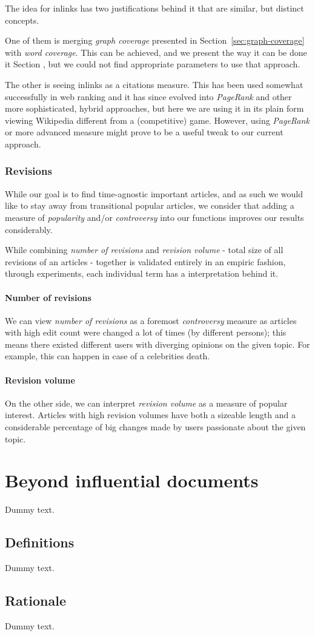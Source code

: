 The idea for inlinks has two justifications behind it that are similar, but
distinct concepts.

One of them is merging \emph{graph coverage} presented in
Section~\ref{sec:graph-coverage} with \emph{word coverage}.
This can be achieved, and we present the way it can be done it Section
, but we could not find
appropriate parameters to use that approach.

The other is seeing inlinks as a citations measure.
This has been used somewhat successfully in web ranking and it has since
evolved into \emph{PageRank} and other more sophisticated, hybrid approaches,
but here we are using it in its plain form viewing Wikipedia different from a
(competitive) game.
However, using \emph{PageRank} or more advanced measure might prove to be a
useful tweak to our current approach.

\subsubsection{Revisions}

While our goal is to find time-agnostic important articles, and as such we
would like to stay away from transitional popular articles, we consider that
adding a measure of \emph{popularity} and/or \emph{controversy} into our
functions improves our results considerably.

While combining \emph{number of revisions} and \emph{revision volume} - total
size of all revisions of an articles - together is validated entirely in an
empiric fashion, through experiments, each individual term has a interpretation
behind it.

\paragraph{Number of revisions}
We can view \emph{number of revisions} as a foremost \emph{controversy} measure
as articles with high edit count were changed a lot of times (by different
persons); this means there existed different users with diverging opinions on
the given topic. For example, this can happen in case of a celebrities death.

\paragraph{Revision volume}
On the other side, we can interpret \emph{revision volume} as a measure of
popular interest. Articles with high revision volumes have both a sizeable
length and a considerable percentage of big changes made by users passionate
about the given topic.

\section{Beyond influential documents}

Dummy text.

\subsection{Definitions}

Dummy text.

\subsection{Rationale}

Dummy text.

